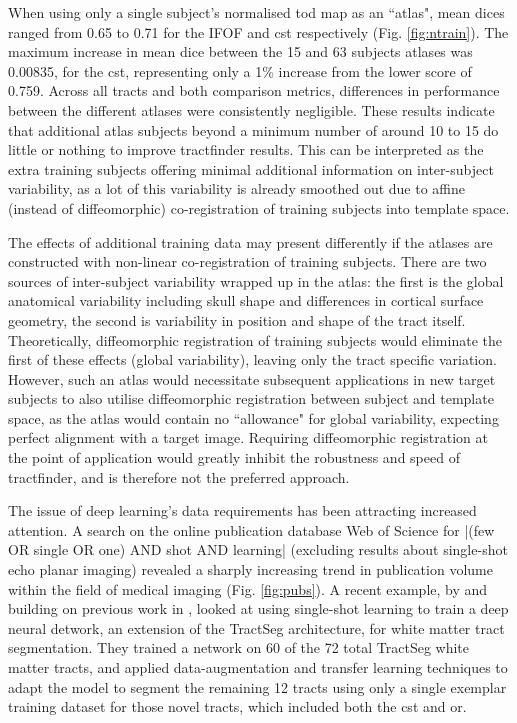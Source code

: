 When using only a single subject's normalised \gls{tod} map as an ``atlas", mean \gls{dice}s ranged from 0.65 to 0.71 for the IFOF and \gls{cst} respectively (Fig. \ref{fig:ntrain}).
The maximum increase in mean \gls{dice} between the 15 and 63 subjects atlases was 0.00835, for the \gls{cst}, representing only a 1\% increase from the lower score of 0.759.
Across all tracts and both comparison metrics, differences in performance between the different atlases were consistently negligible.
These results indicate that additional atlas subjects beyond a minimum number of around 10 to 15 do little or nothing to improve tractfinder results.
This can be interpreted as the extra training subjects offering minimal additional information on inter-subject variability, as a lot of this variability is already smoothed out due to affine (instead of diffeomorphic) co-registration of training subjects into template space.

The effects of additional training data may present differently if the atlases are constructed with non-linear co-registration of training subjects. %
There are two sources of inter-subject variability wrapped up in the atlas: the first is the global anatomical variability including skull shape and differences in cortical surface geometry, the second is variability in position and shape of the tract itself.
Theoretically, diffeomorphic registration of training subjects would eliminate the first of these effects (global variability), leaving only the tract specific variation.
However, such an atlas would necessitate subsequent applications in new target subjects to also utilise diffeomorphic registration between subject and template space, as the atlas would contain no ``allowance" for global variability, expecting perfect alignment with a target image.
Requiring diffeomorphic registration at the point of application would greatly inhibit the robustness and speed of tractfinder, and is therefore not the preferred approach.

The issue of deep learning's data requirements has been attracting increased attention.
A search on the online publication database Web of Science for \spverb|(few OR single OR one) AND shot AND learning|  (excluding results about single-shot echo planar imaging) revealed a sharply increasing trend in publication volume within the field of medical imaging (Fig. \ref{fig:pubs}).
A recent example, by \textcite{Liu2023a} and building on previous work in \textcite{Lu2021}, looked at using single-shot learning to train a deep neural detwork, an extension of the TractSeg architecture, for white matter tract segmentation.
They trained a network on 60 of the 72 total TractSeg white matter tracts, and applied data-augmentation and transfer learning techniques to adapt the model to segment the remaining 12 tracts using only a single exemplar training dataset for those novel tracts, which included both the \gls{cst} and \gls{or}.

